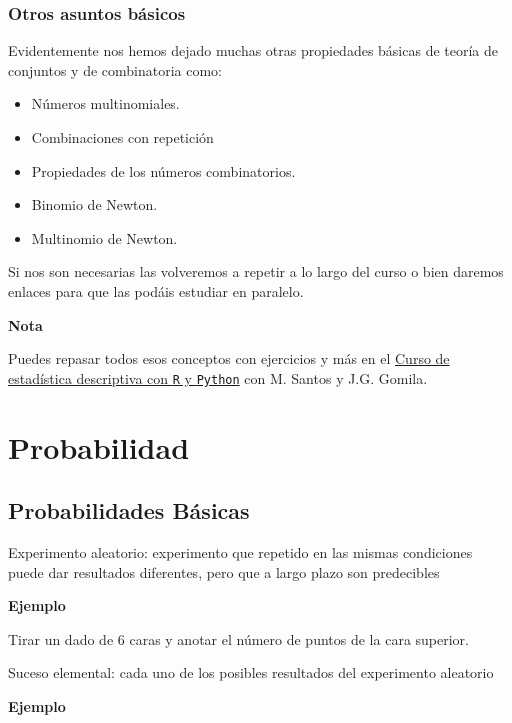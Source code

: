 \documentclass[]{book}
\providecommand{\tightlist}{%
  \setlength{\itemsep}{0pt}\setlength{\parskip}{0pt}}
\begin{document}
\hypertarget{otros-asuntos-buxe1sicos}{%
\subsection{Otros asuntos básicos}\label{otros-asuntos-buxe1sicos}}

Evidentemente nos hemos dejado muchas otras propiedades básicas de teoría de conjuntos y de combinatoria como:

\begin{itemize}
\tightlist
\item
  Números multinomiales.
\item
  Combinaciones con repetición
\item
  Propiedades de los números combinatorios.
\item
  Binomio de Newton.
\item
  Multinomio de Newton.
\end{itemize}

Si nos son necesarias las volveremos a repetir a lo largo del curso o bien daremos enlaces para que las podáis estudiar en paralelo.

\textbf{Nota}

Puedes repasar todos esos conceptos con ejercicios y más en el \href{https://www.udemy.com/course/estadistica-descriptiva?couponCode=JB_PROMO_OFF}{Curso de estadística descriptiva con \texttt{R} y \texttt{Python}} con M. Santos y J.G. Gomila.

\hypertarget{probabilidad}{%
\chapter{Probabilidad}\label{probabilidad}}

\hypertarget{probabilidades-buxe1sicas}{%
\section{Probabilidades Básicas}\label{probabilidades-buxe1sicas}}

 Experimento aleatorio: experimento que repetido en las mismas condiciones puede dar resultados diferentes, pero que a largo plazo son predecibles

\textbf{Ejemplo}

Tirar un dado de 6 caras y anotar el número de puntos de la cara superior.

Suceso elemental: cada uno de los posibles resultados del experimento aleatorio

\textbf{Ejemplo}
\end{document}

